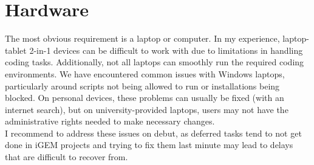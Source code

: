 

\section{Hardware}
The most obvious requirement is a laptop or computer.
In my experience, laptop-tablet 2-in-1 devices can be difficult to work with due to limitations in handling coding tasks.
Additionally, not all laptops can smoothly run the required coding environments.
We have encountered common issues with Windows laptops, particularly around scripts not being allowed to run or installations being blocked.
On personal devices, these problems can usually be fixed (with an internet search), but on university-provided
laptops, users may not have the administrative rights needed to make necessary changes. \\ \newline
I recommend to address these issues on debut, as deferred tasks tend to not get done in iGEM projects and trying to fix
them last minute may lead to delays that are difficult to recover from.